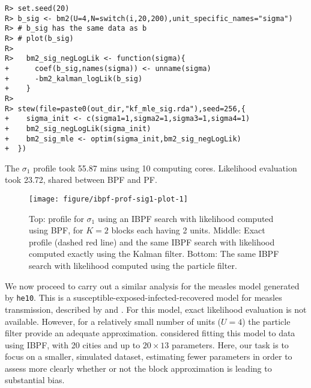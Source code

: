 \documentclass[12pt]{article}\usepackage[]{graphicx}\usepackage[]{xcolor}
\makeatletter
\newenvironment{kframe}{%
 \def\at@end@of@kframe{}%
 \ifinner\ifhmode%
  \def\at@end@of@kframe{\end{minipage}}%
  \begin{minipage}{\columnwidth}%
 \fi\fi%
 \def\FrameCommand##1{\hskip\@totalleftmargin \hskip-\fboxsep
 \colorbox{shadecolor}{##1}\hskip-\fboxsep
     \hskip-\linewidth \hskip-\@totalleftmargin \hskip\columnwidth}%
 \MakeFramed {\advance\hsize-\width
   \@totalleftmargin\z@ \linewidth\hsize
   \@setminipage}}%
 {\par\unskip\endMakeFramed%
 \at@end@of@kframe}
\newenvironment{knitrout}{}{} %
\newcommand\code[1]{\texttt{#1}}
\makeatother
\begin{document}
\begin{knitrout}
\color{fgcolor}\begin{kframe}
\begin{verbatim}
R> set.seed(20)
R> b_sig <- bm2(U=4,N=switch(i,20,200),unit_specific_names="sigma")
R> # b_sig has the same data as b
R> # plot(b_sig)
R> 
R>   bm2_sig_negLogLik <- function(sigma){
+      coef(b_sig,names(sigma)) <- unname(sigma)
+      -bm2_kalman_logLik(b_sig)
+    }
R> 
R> stew(file=paste0(out_dir,"kf_mle_sig.rda"),seed=256,{
+    sigma_init <- c(sigma1=1,sigma2=1,sigma3=1,sigma4=1)
+    bm2_sig_negLogLik(sigma_init)
+    bm2_sig_mle <- optim(sigma_init,bm2_sig_negLogLik)
+  })
\end{verbatim}
\end{kframe}
\end{knitrout}









The $\sigma_1$ profile took 55.87 mins using 10 computing cores.
Likelihood evaluation took 23.72, shared between BPF and PF.

\begin{knitrout}
\color{fgcolor}\begin{figure}

\texttt{[image: figure/ibpf-prof-sig1-plot-1]} \hfill{}

\caption[Top]{Top: profile for $\sigma_1$ using an IBPF search with likelihood computed using BPF, for $K=2$ blocks each having 2 units. Middle: Exact profile (dashed red line) and the same IBPF search with likelihood computed exactly using the Kalman filter. Bottom: The same IBPF search with likelihood computed using the particle filter.}\label{fig:ibpf-prof-sig1-plot}
\end{figure}

\end{knitrout}


We now proceed to carry out a similar analysis for the measles model generated by \code{he10}.
This is a susceptible-exposed-infected-recovered model for measles transmission, described by \citet{ionides22} and \citet{asfaw21arxiv}.
For this model, exact likelihood evaluation is not available.
However, for a relatively small number of units ($U=4$) the particle filter provide an adequate approximation.
\citet{ionides22} considered fitting this model to data using IBPF, with 20 cities and up to $20\times 13$ parameters.
Here, our task is to focus on a smaller, simulated dataset, estimating fewer parameters in order to assess more clearly whether or not the block approximation is leading to substantial bias.
\end{document}
